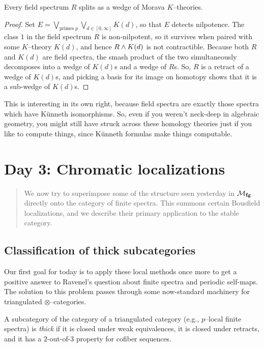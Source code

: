 \begin{theorem}
Every field spectrum $R$ splits as a wedge of Morava $K$--theories.
\end{theorem}
\begin{proof}
Set $E = \bigvee_{\text{primes $p$}} \bigvee_{d \in [0, \infty]} K(d)$, so that $E$ detects nilpotence.  The class $1$ in the field spectrum $R$ is non-nilpotent, so it survives when paired with some $K$--theory $K(d)$, and hence $R \wedge K(d)$ is not contractible.  Because both $R$ and $K(d)$ are field spectra, the smash product of the two simultaneously decomposes into a wedge of $K(d)$s and a wedge of $R$s.  So, $R$ is a retract of a wedge of $K(d)$s, and picking a basis for its image on homotopy shows that it is a sub-wedge of $K(d)$s.
\end{proof}

\noindent This is interesting in its own right, because field spectra are exactly those spectra which have K\"unneth isomorphisms.  So, even if you weren't neck-deep in algebraic geometry, you might still have struck across these homology theories just if you like to compute things, since K\"unneth formulas make things computable.






\newpage
\section{Day 3: Chromatic localizations}

\begin{abstract}
We now try to superimpose some of the structure seen yesterday in $\mathcal{M}_{\mathbf{fg}}$ directly onto the category of finite spectra.  This summons certain Bousfield localizations, and we describe their primary application to the stable category.
\end{abstract}


\subsection{Classification of thick subcategories}

Our first goal for today is to apply these local methods once more to get a positive answer to Ravenel's question about finite spectra and periodic self-maps.  The solution to this problem passes through some now-standard machinery for triangulated $\otimes$--categories.

\begin{definition}
A subcategory of the category of a triangulated category (e.g., $p$--local finite spectra) is \textit{thick} if it is closed under weak equivalences, it is closed under retracts, and it has a $2$-out-of-$3$ property for cofiber sequences.
\end{definition}

